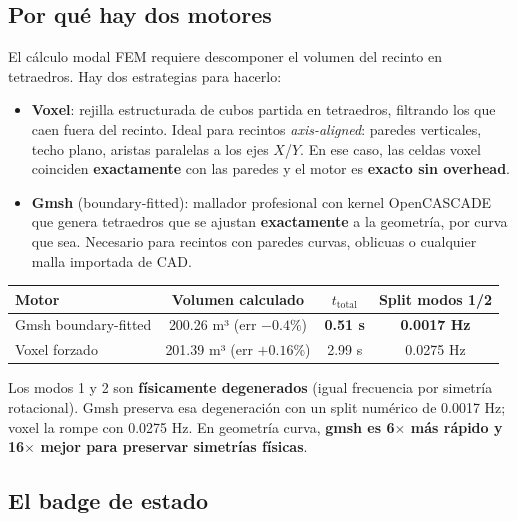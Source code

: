 \documentclass[11pt, a4paper]{article}
\newenvironment{nota}[1][Nota]{%
  \begin{tcolorbox}[mybox=cBlue, title={#1}]%
}{\end{tcolorbox}}
\begin{document}
\subsection{Por qué hay dos motores}

El cálculo modal FEM requiere descomponer el volumen del recinto en
tetraedros. Hay dos estrategias para hacerlo:

\begin{itemize}[itemsep=4pt]
  \item \textbf{Voxel}: rejilla estructurada de cubos partida en tetraedros,
        filtrando los que caen fuera del recinto. Ideal para recintos
        \textit{axis-aligned}: paredes verticales, techo plano, aristas
        paralelas a los ejes $X$/$Y$. En ese caso, las celdas voxel coinciden
        \textbf{exactamente} con las paredes y el motor es \textbf{exacto sin
        overhead}.
  \item \textbf{Gmsh} (boundary-fitted): mallador profesional con kernel
        OpenCASCADE que genera tetraedros que se ajustan \textbf{exactamente}
        a la geometría, por curva que sea. Necesario para recintos con
        paredes curvas, oblicuas o cualquier malla importada de CAD.
\end{itemize}

\begin{nota}[Evidencia experimental — cilindro $R=4$ m, $H=4$ m]
\begin{tabular}{lccc}
  \toprule
  Motor & Volumen calculado & $t_{\text{total}}$ & Split modos 1/2 \\
  \midrule
  Gmsh boundary-fitted & 200.26 m³ (err $-0.4\%$) & \textbf{0.51 s} & \textbf{0.0017 Hz} \\
  Voxel forzado        & 201.39 m³ (err $+0.16\%$) & 2.99 s & 0.0275 Hz \\
  \bottomrule
\end{tabular}

\vspace{0.3em}
Los modos 1 y 2 son \textbf{físicamente degenerados} (igual frecuencia por
simetría rotacional). Gmsh preserva esa degeneración con un split numérico
de 0.0017 Hz; voxel la rompe con 0.0275 Hz. En geometría curva,
\textbf{gmsh es 6\(\times\) más rápido y 16\(\times\) mejor para preservar
simetrías físicas}.
\end{nota}

\subsection{El badge de estado}
\end{document}
